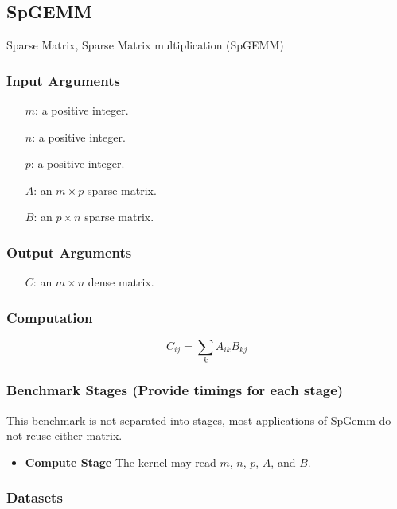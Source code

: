 \documentclass{article}
\begin{document}
\subsection{SpGEMM}
Sparse Matrix, Sparse Matrix multiplication (SpGEMM)
\subsubsection{Input Arguments}

\begin{itemize}
	\item[$m$:] a positive integer.
	\item[$n$:] a positive integer.
	\item[$p$:] a positive integer.
	\item[$A$:] an $m \times p$ sparse matrix.
	\item[$B$:] an $p \times n$ sparse matrix.
\end{itemize}

\subsubsection{Output Arguments}

\begin{itemize}
	\item[$C$:] an $m \times n$ dense matrix.
\end{itemize}

\subsubsection{Computation}

$$C_{ij} = \sum_{k}A_{ik}B_{kj}$$

\subsubsection{Benchmark Stages (Provide timings for each stage)}

This benchmark is not separated into stages, most applications of SpGemm do not
reuse either matrix.

\begin{itemize}
\item \textbf{Compute Stage}
	The kernel may read $m$, $n$, $p$, $A$, and $B$.
\end{itemize}

\subsubsection{Datasets}
\end{document}
